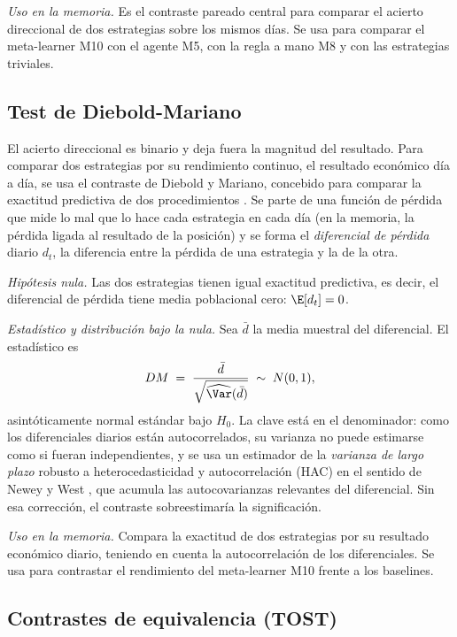 \emph{Uso en la memoria.} Es el contraste pareado central para comparar el acierto direccional de dos estrategias sobre los mismos días. Se usa para comparar el meta-learner M10 con el agente M5, con la regla a mano M8 y con las estrategias triviales.

\subsection{Test de Diebold-Mariano}
\label{sec:tests-dm}

El acierto direccional es binario y deja fuera la magnitud del resultado. Para comparar dos estrategias por su rendimiento continuo, el resultado económico día a día, se usa el contraste de Diebold y Mariano, concebido para comparar la exactitud predictiva de dos procedimientos \cite{diebold1995}. Se parte de una función de pérdida que mide lo mal que lo hace cada estrategia en cada día (en la memoria, la pérdida ligada al resultado de la posición) y se forma el \emph{diferencial de pérdida} diario $d_t$, la diferencia entre la pérdida de una estrategia y la de la otra.

\emph{Hipótesis nula.} Las dos estrategias tienen igual exactitud predictiva, es decir, el diferencial de pérdida tiene media poblacional cero: $\E[d_t] = 0$.

\emph{Estadístico y distribución bajo la nula.} Sea $\bar d$ la media muestral del diferencial. El estadístico es
\[
DM \;=\; \frac{\bar d}{\sqrt{\widehat{\Var}(\bar d)}} \;\sim\; N(0, 1),
\]
asintóticamente normal estándar bajo $H_0$. La clave está en el denominador: como los diferenciales diarios están autocorrelados, su varianza no puede estimarse como si fueran independientes, y se usa un estimador de la \emph{varianza de largo plazo} robusto a heterocedasticidad y autocorrelación (HAC) en el sentido de Newey y West \cite{newey1987}, que acumula las autocovarianzas relevantes del diferencial. Sin esa corrección, el contraste sobreestimaría la significación.

\emph{Uso en la memoria.} Compara la exactitud de dos estrategias por su resultado económico diario, teniendo en cuenta la autocorrelación de los diferenciales. Se usa para contrastar el rendimiento del meta-learner M10 frente a los baselines.

\subsection{Contrastes de equivalencia (TOST)}
\label{sec:tests-tost}

